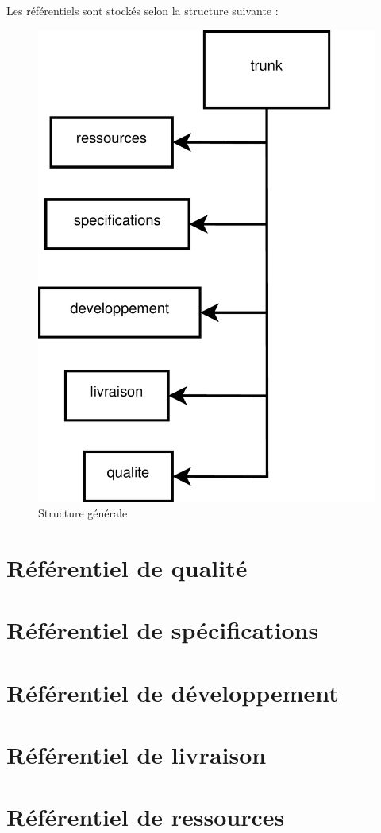 Les référentiels sont stockés selon la structure suivante : 

\begin{figure}[ht]
         \begin{center}
         \includegraphics[scale=1.0]{images/arboTrunk}
         \end{center}
         \caption{Structure générale}
 \end{figure}
 
 \section{Référentiel de qualité}
 
  
 \section{Référentiel de spécifications}
 
 
  \section{Référentiel de développement}
 
 
  \section{Référentiel de livraison}
 
 
  \section{Référentiel de ressources}
 
